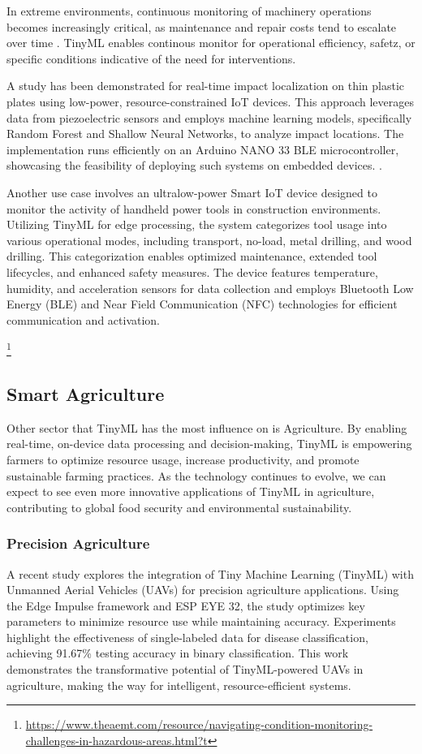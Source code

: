 \documentclass[twocolumn]{article}
\begin{document}
In extreme environments, continuous monitoring of machinery operations becomes increasingly critical, as maintenance and repair costs tend to escalate over time . TinyML enables continous monitor for operational efficiency, safetz, or specific conditions indicative of the need for interventions.

A study has been demonstrated for real-time impact localization on thin plastic plates using low-power, resource-constrained IoT devices. This approach leverages data from piezoelectric sensors and employs machine learning models, specifically Random Forest and Shallow Neural Networks, to analyze impact locations. The implementation runs efficiently on an Arduino NANO 33 BLE microcontroller, showcasing the feasibility of deploying such systems on embedded devices. \cite{noauthor_smart_nodate}.


Another use case involves an ultralow-power Smart IoT device designed to monitor the activity of handheld power tools in construction environments. Utilizing TinyML for edge processing, the system categorizes tool usage into various operational modes, including transport, no-load, metal drilling, and wood drilling. This categorization enables optimized maintenance, extended tool lifecycles, and enhanced safety measures. The device features temperature, humidity, and acceleration sensors for data collection and employs Bluetooth Low Energy (BLE) and Near Field Communication (NFC) technologies for efficient communication and activation. \cite{giordano_design_2022}

\footnote{\url{https://www.theaemt.com/resource/navigating-condition-monitoring-challenges-in-hazardous-areas.html?t}}

\subsection{Smart Agriculture}
Other sector that TinyML has the most influence on is Agriculture.  By enabling real-time, on-device data processing and decision-making, TinyML is empowering farmers to optimize resource usage, increase productivity, and promote sustainable farming practices. As the technology continues to evolve, we can expect to see even more innovative applications of TinyML in agriculture, contributing to global food security and environmental sustainability.


\subsubsection{Precision Agriculture}
A recent study explores the integration of Tiny Machine Learning (TinyML) with Unmanned Aerial Vehicles (UAVs) for precision agriculture applications. Using the Edge Impulse framework and ESP EYE 32, the study optimizes key parameters to minimize resource use while maintaining accuracy. Experiments highlight the effectiveness of single-labeled data for disease classification, achieving 91.67\% testing accuracy in binary classification. This work demonstrates the transformative potential of TinyML-powered UAVs in agriculture, making the way for intelligent, resource-efficient systems. \cite{annadata_tinyml_2024}
\end{document}
